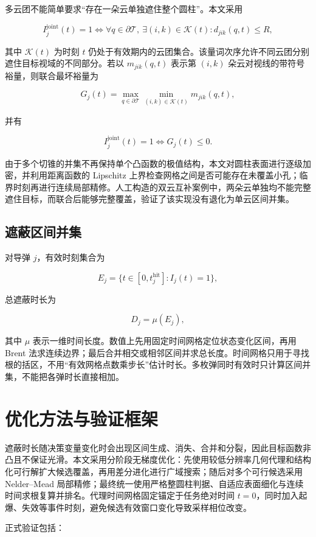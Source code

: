 多云团不能简单要求“存在一朵云单独遮住整个圆柱”。本文采用

\[
I_j^{\mathrm{joint}}(t)=1
\iff
\forall q\in\partial\mathcal T,\ \exists(i,k)\in\mathcal K(t):
d_{jik}(q,t)\le R,
\]

其中 $\mathcal K(t)$ 为时刻 $t$ 仍处于有效期内的云团集合。该量词次序允许不同云团分别遮住目标视域的不同部分。若以 $m_{jik}(q,t)$ 表示第 $(i,k)$ 朵云对视线的带符号裕量，则联合最坏裕量为

\[
G_j(t)=\max_{q\in\partial\mathcal T}
\min_{(i,k)\in\mathcal K(t)}m_{jik}(q,t),
\]

并有

\[
I_j^{\mathrm{joint}}(t)=1\iff G_j(t)\le0.
\]

由于多个切锥的并集不再保持单个凸函数的极值结构，本文对圆柱表面进行逐级加密，并利用距离函数的 Lipschitz 上界检查网格之间是否可能存在未覆盖小孔；临界时刻再进行连续局部精修。人工构造的双云互补案例中，两朵云单独均不能完整遮住目标，而联合后能够完整覆盖，验证了该实现没有退化为单云区间并集。

\subsection{遮蔽区间并集}

对导弹 $j$，有效时刻集合为

\[
E_j=\{t\in[0,t_j^{\mathrm{hit}}]:I_j(t)=1\},
\]

总遮蔽时长为

\[
D_j=\mu(E_j),
\]

其中 $\mu$ 表示一维时间长度。数值上先用固定时间网格定位状态变化区间，再用 Brent 法求连续边界；最后合并相交或相邻区间并求总长度。时间网格只用于寻找根的括区，不用“有效网格点数乘步长”估计时长。多枚弹同时有效时只计算区间并集，不能把各弹时长直接相加。

\section{优化方法与验证框架}

遮蔽时长随决策变量变化时会出现区间生成、消失、合并和分裂，因此目标函数非凸且不保证光滑。本文采用分阶段无梯度优化：先使用较低分辨率几何代理和结构化可行解扩大候选覆盖，再用差分进化进行广域搜索；随后对多个可行候选采用 Nelder–Mead 局部精修；最终统一使用严格整圆柱判据、自适应表面细化与连续时间求根复算并排名。代理时间网格固定锚定于任务绝对时间 $t=0$，同时加入起爆、失效等事件时刻，避免候选有效窗口变化导致采样相位改变。

正式验证包括：

